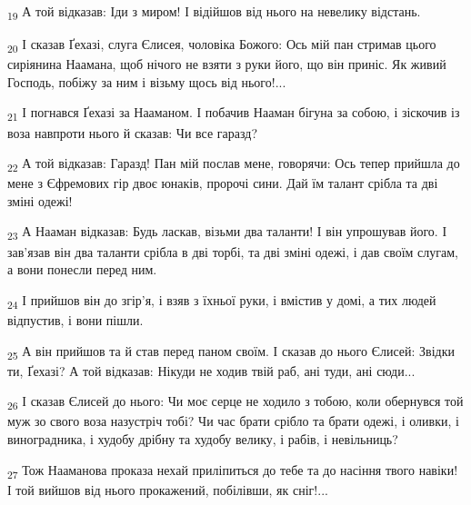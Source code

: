 \begin{tcolorbox}
\textsubscript{19} А той відказав: Іди з миром! І відійшов від нього на невелику відстань.
\end{tcolorbox}
\begin{tcolorbox}
\textsubscript{20} І сказав Ґехазі, слуга Єлисея, чоловіка Божого: Ось мій пан стримав цього сиріянина Наамана, щоб нічого не взяти з руки його, що він приніс. Як живий Господь, побіжу за ним і візьму щось від нього!...
\end{tcolorbox}
\begin{tcolorbox}
\textsubscript{21} І погнався Ґехазі за Нааманом. І побачив Нааман бігуна за собою, і зіскочив із воза навпроти нього й сказав: Чи все гаразд?
\end{tcolorbox}
\begin{tcolorbox}
\textsubscript{22} А той відказав: Гаразд! Пан мій послав мене, говорячи: Ось тепер прийшла до мене з Єфремових гір двоє юнаків, пророчі сини. Дай їм талант срібла та дві зміні одежі!
\end{tcolorbox}
\begin{tcolorbox}
\textsubscript{23} А Нааман відказав: Будь ласкав, візьми два таланти! І він упрошував його. І зав'язав він два таланти срібла в дві торбі, та дві зміні одежі, і дав своїм слугам, а вони понесли перед ним.
\end{tcolorbox}
\begin{tcolorbox}
\textsubscript{24} І прийшов він до згір'я, і взяв з їхньої руки, і вмістив у домі, а тих людей відпустив, і вони пішли.
\end{tcolorbox}
\begin{tcolorbox}
\textsubscript{25} А він прийшов та й став перед паном своїм. І сказав до нього Єлисей: Звідки ти, Ґехазі? А той відказав: Нікуди не ходив твій раб, ані туди, ані сюди...
\end{tcolorbox}
\begin{tcolorbox}
\textsubscript{26} І сказав Єлисей до нього: Чи моє серце не ходило з тобою, коли обернувся той муж зо свого воза назустріч тобі? Чи час брати срібло та брати одежі, і оливки, і виноградника, і худобу дрібну та худобу велику, і рабів, і невільниць?
\end{tcolorbox}
\begin{tcolorbox}
\textsubscript{27} Тож Нааманова проказа нехай приліпиться до тебе та до насіння твого навіки! І той вийшов від нього прокажений, побілівши, як сніг!...
\end{tcolorbox}

